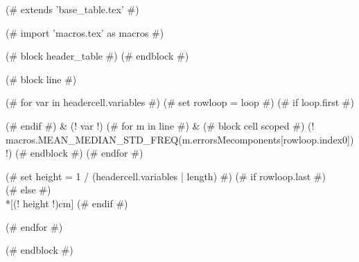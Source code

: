 (# extends 'base_table.tex' #)

(# import 'macros.tex' as macros #)


(# block header_table #)
(# endblock #)


(# block line #)

    (# for var in headercell.variables #)
    (# set rowloop = loop #)
    (# if loop.first #)


    (# endif #)
    & (! var !)
        (# for m in line #)
        &
            (# block cell scoped #)
            (! macros.MEAN_MEDIAN_STD_FREQ(m.errorsMecomponents[rowloop.index0]) !)
            (# endblock #)
        (# endfor #)

    (# set height = 1 / (headercell.variables | length)  #)
    (# if rowloop.last #) \\[(! height !)cm]    (# else #) \\*[(! height !)cm] (# endif #)

    (# endfor #)

(# endblock  #)